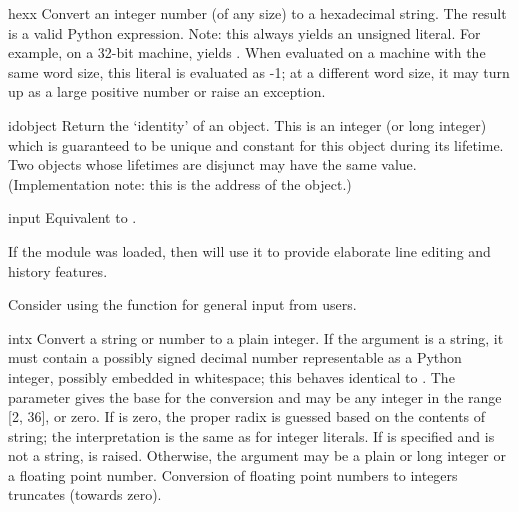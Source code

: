 \begin{funcdesc}{hex}{x}
  Convert an integer number (of any size) to a hexadecimal string.
  The result is a valid Python expression.  Note: this always yields
  an unsigned literal.  For example, on a 32-bit machine,
   yields .  When evaluated on a
  machine with the same word size, this literal is evaluated as -1; at
  a different word size, it may turn up as a large positive number or
  raise an  exception.
\end{funcdesc}

\begin{funcdesc}{id}{object}
  Return the `identity' of an object.  This is an integer (or long
  integer) which is guaranteed to be unique and constant for this
  object during its lifetime.  Two objects whose lifetimes are
  disjunct may have the same  value.  (Implementation
  note: this is the address of the object.)
\end{funcdesc}

\begin{funcdesc}{input}{}
  Equivalent to .

  If the  module was loaded, then
   will use it to provide elaborate line editing and
  history features.

  Consider using the  function for general input
  from users.
\end{funcdesc}

\begin{funcdesc}{int}{x}
  Convert a string or number to a plain integer.  If the argument is a
  string, it must contain a possibly signed decimal number
  representable as a Python integer, possibly embedded in whitespace;
  this behaves identical to .  The  parameter gives the base for the
  conversion and may be any integer in the range [2, 36], or zero.  If
   is zero, the proper radix is guessed based on the
  contents of string; the interpretation is the same as for integer
  literals.  If  is specified and  is not a string,
   is raised.
  Otherwise, the argument may be a plain or
  long integer or a floating point number.  Conversion of floating
  point numbers to integers truncates (towards zero).
\end{funcdesc}

